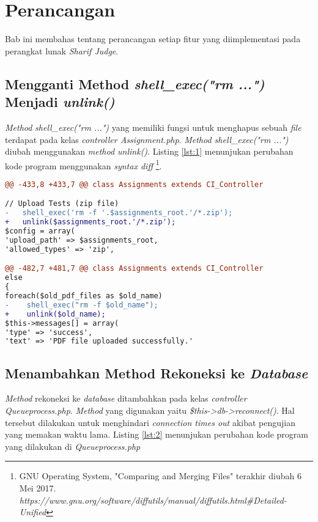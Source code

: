 \chapter{Perancangan}
\label{chap:perancangan}

Bab ini membahas tentang perancangan setiap fitur yang diimplementasi pada perangkat lunak \textit{Sharif Judge}. 

\section{Mengganti Method \textit{shell\_exec("rm ...")} Menjadi \textit{unlink()}}
\textit{Method} \textit{shell\_exec("rm ...")} yang memiliki fungsi untuk menghapus sebuah \textit{file} terdapat pada kelas \textit{controller Assignment.php}. \textit{Method shell\_exec("rm ...")} diubah menggunakan \textit{method unlink()}. Listing \ref{lst:1} menunjukan perubahan kode program menggunakan \textit{syntax diff} \footnote{GNU Operating System, "Comparing and Merging Files" terakhir diubah 6 Mei 2017. \textit{https://www.gnu.org/software/diffutils/manual/diffutils.html\#Detailed-Unified}}.

\begin{lstlisting}[language=diff, caption=Perubahan kode program pada \textit{Assignment.php}, label=lst:1, basicstyle=\ttfamily, frame=single,
columns=fullflexible, keepspaces=true]
@@ -433,8 +433,7 @@ class Assignments extends CI_Controller

// Upload Tests (zip file)
-   shell_exec('rm -f '.$assignments_root.'/*.zip');
+   unlink($assignments_root.'/*.zip');
$config = array(
'upload_path' => $assignments_root,
'allowed_types' => 'zip',

@@ -482,7 +481,7 @@ class Assignments extends CI_Controller
else
{
foreach($old_pdf_files as $old_name)
-    shell_exec("rm -f $old_name");
+    unlink($old_name);
$this->messages[] = array(
'type' => 'success',
'text' => 'PDF file uploaded successfully.'
\end{lstlisting}

\section{Menambahkan Method Rekoneksi ke \textit{Database}}
\textit{Method} rekoneksi ke \textit{database} ditambahkan pada kelas \textit{controller Queueprocess.php}. \textit{Method} yang digunakan yaitu \textit{\$this->db->reconnect()}. %
Hal tersebut dilakukan untuk menghindari \textit{connection times out} akibat pengujian yang memakan waktu lama. Listing \ref{lst:2} menunjukan perubahan kode program yang dilakukan di \textit{Queueprocess.php}

